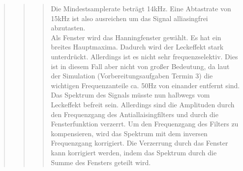 \begin{quote}
\begin{quote}
\begin{quote}
            Die Mindestsamplerate beträgt 14kHz. Eine Abtastrate von 15kHz ist also ausreichen um das Signal
            alliasingfrei abzutasten.\\
            Als Fenster wird das Hanningfenster gewählt. Es hat ein breites Hauptmaxima. Dadurch wird der Leckeffekt
            stark unterdrückt. Allerdings ist es nicht sehr frequenzselektiv. Dies ist in diesem Fall aber nicht von
            großer Bedeutung, da laut der Simulation (Vorbereitungsaufgaben Termin 3) die wichtigen Frequenzanteile ca.
            50Hz von einander entfernt sind.\\
            Das Spektrum des Signals müsste nun halbwegs vom Leckeffekt befreit sein.
            Allerdings sind die Amplituden durch den Frequenzgang des Antiallaisingfilters und durch die Fensterfunktion
            verzerrt. Um den Frequenzgang des Filters zu kompensieren, wird das Spektrum mit dem inversen Frequenzgang
            korrigiert. Die Verzerrung durch das Fenster kann korrigiert werden, indem das Spektrum durch die Summe des
            Fensters geteilt wird.\\
            
            \begin{figure}[H]
                \centering
                

\end{figure}
\end{quote}
\end{quote}
\end{quote}
